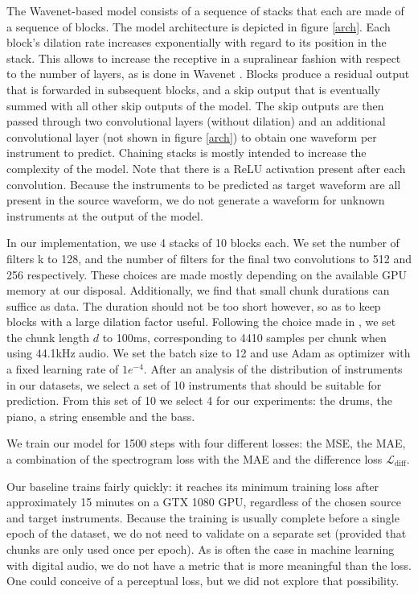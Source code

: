 \documentclass[twocolumn,superscriptaddress,aps]{revtex4-1}
\begin{document}
The Wavenet-based model consists of a sequence of stacks that each are made of a sequence of blocks. The model architecture is depicted in figure \ref{arch}. Each block's dilation rate increases exponentially with regard to its position in the stack. This allows to increase the receptive in a supralinear fashion with respect to the number of layers, as is done in Wavenet \cite{WaveNet}. Blocks produce a residual output that is forwarded in subsequent blocks, and a skip output that is eventually summed with all other skip outputs of the model. The skip outputs are then passed through two convolutional layers (without dilation) and an additional convolutional layer (not shown in figure \ref{arch}) to obtain one waveform per instrument to predict. Chaining stacks is mostly intended to increase the complexity of the model. Note that there is a ReLU activation present after each convolution. Because the instruments to be predicted as target waveform are all present in the source waveform, we do not generate a waveform for unknown instruments at the output of the model.

In our implementation, we use 4 stacks of 10 blocks each. We set the number of filters k to 128, and the number of filters for the final two convolutions to 512 and 256 respectively. These choices are made mostly depending on the available GPU memory at our disposal. Additionally, we find that small chunk durations can suffice as data. The duration should not be too short however, so as to keep blocks with a large dilation factor useful. Following the choice made in \cite{SourceSeparationWaveformDomain}, we set the chunk length $d$ to 100ms, corresponding to 4410 samples per chunk when using 44.1kHz audio. We set the batch size to 12 and use Adam as optimizer with a fixed learning rate of $1e^{-4}$. After an analysis of the distribution of instruments in our datasets, we select a set of 10 instruments that should be suitable for prediction. From this set of 10 we select 4 for our experiments: the drums, the piano, a string ensemble and the bass.

We train our model for 1500 steps with four different losses: the MSE, the MAE, a combination of the spectrogram loss with the MAE and the difference loss $\mathcal{L}_{\text{diff}}$.

Our baseline trains fairly quickly: it reaches its minimum training loss after approximately 15 minutes on a GTX 1080 GPU, regardless of the chosen source and target instruments. Because the training is usually complete before a single epoch of the dataset, we do not need to validate on a separate set (provided that chunks are only used once per epoch). As is often the case in machine learning with digital audio, we do not have a metric that is more meaningful than the loss. One could conceive of a perceptual loss, but we did not explore that possibility.
\end{document}
